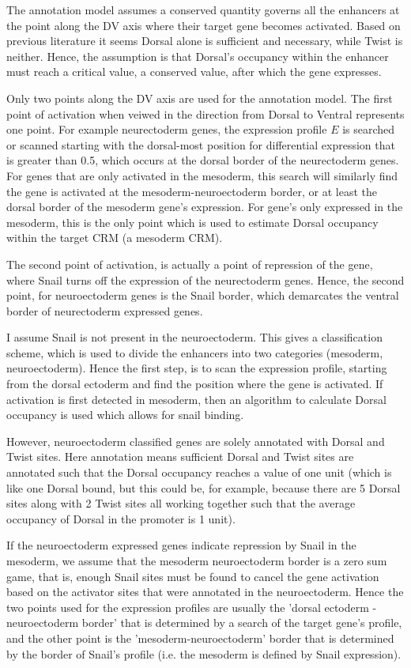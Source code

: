 The annotation model assumes a conserved quantity governs all the enhancers at the point along the DV axis where their target gene becomes activated.  Based on previous literature it seems Dorsal alone is sufficient and necessary, while Twist is neither.  Hence, the assumption is that Dorsal's occupancy within the enhancer must reach a critical value, a conserved value, after which the gene expresses.  

Only two points along the DV axis are used for the annotation model.  The first point of activation when veiwed in the direction from Dorsal to Ventral represents one point.  For example neurectoderm genes, the expression profile $E$ is searched or scanned starting with the dorsal-most position for differential expression that is greater than 0.5, which occurs at the dorsal border of the neurectoderm genes.  For genes that are only activated in the mesoderm, this search will similarly find the gene is activated at the mesoderm-neuroectoderm border, or at least the dorsal border of the mesoderm gene's expression.  For gene's only expressed in the mesoderm, this is the only point which is used to estimate Dorsal occupancy within the target CRM (a mesoderm CRM).  

The second point of activation, is actually a point of repression of the gene, where Snail turns off the expression of the neurectoderm genes.  Hence, the second point, for neuroectoderm genes is the Snail border, which demarcates the ventral border of neurectoderm expressed genes. 

I assume Snail is not present in the neuroectoderm.  This gives a classification scheme, which is used to divide the enhancers into two categories (mesoderm, neuroectoderm).  Hence the first step, is to scan the expression profile, starting from the dorsal ectoderm and find the position where the gene is activated.  If activation is first detected in mesoderm, then an algorithm to calculate Dorsal occupancy is used which allows for snail binding.

  However, neuroectoderm classified genes are solely annotated with Dorsal and Twist sites.  Here annotation means sufficient Dorsal and Twist sites are annotated such that the Dorsal occupancy reaches a value of one unit (which is like one Dorsal bound, but this could be, for example, because there are 5 Dorsal sites along with 2 Twist sites all working together such that the average occupancy of Dorsal in the promoter is 1 unit).  
  
  If the neuroectoderm expressed genes indicate repression by Snail in the mesoderm, we assume that the mesoderm neuroectoderm border is a zero sum game, that is, enough Snail sites must be found to cancel the gene activation based on the activator sites that were annotated in the neuroectoderm.  Hence the two points used for the expression profiles are usually the 'dorsal ectoderm - neuroectoderm border' that is determined by a search of the target gene's profile, and the other point is the 'mesoderm-neuroectoderm' border that is determined by the border of Snail's profile (i.e. the mesoderm is defined by Snail expression).
  
